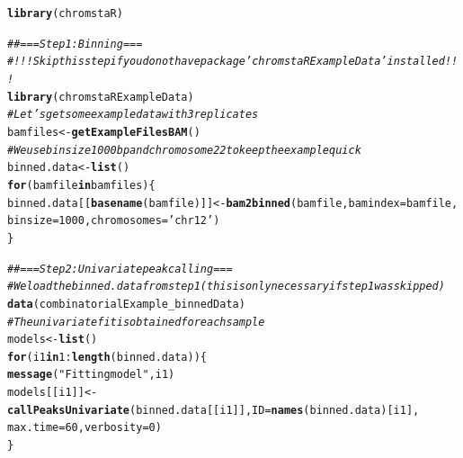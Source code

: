 \documentclass[11pt]{article}\usepackage[]{graphicx}\usepackage[]{color}
\makeatletter
\newcommand{\hlnum}[1]{\textcolor[rgb]{0.686,0.059,0.569}{#1}}%
\newcommand{\hlstr}[1]{\textcolor[rgb]{0.192,0.494,0.8}{#1}}%
\newcommand{\hlcom}[1]{\textcolor[rgb]{0.678,0.584,0.686}{\textit{#1}}}%
\newcommand{\hlopt}[1]{\textcolor[rgb]{0,0,0}{#1}}%
\newcommand{\hlstd}[1]{\textcolor[rgb]{0.345,0.345,0.345}{#1}}%
\newcommand{\hlkwa}[1]{\textcolor[rgb]{0.161,0.373,0.58}{\textbf{#1}}}%
\newcommand{\hlkwb}[1]{\textcolor[rgb]{0.69,0.353,0.396}{#1}}%
\newcommand{\hlkwc}[1]{\textcolor[rgb]{0.333,0.667,0.333}{#1}}%
\newcommand{\hlkwd}[1]{\textcolor[rgb]{0.737,0.353,0.396}{\textbf{#1}}}%
\newenvironment{kframe}{%
 \def\at@end@of@kframe{}%
 \ifinner\ifhmode%
  \def\at@end@of@kframe{\end{minipage}}%
  \begin{minipage}{\columnwidth}%
 \fi\fi%
 \def\FrameCommand##1{\hskip\@totalleftmargin \hskip-\fboxsep
 \colorbox{shadecolor}{##1}\hskip-\fboxsep
     \hskip-\linewidth \hskip-\@totalleftmargin \hskip\columnwidth}%
 \MakeFramed {\advance\hsize-\width
   \@totalleftmargin\z@ \linewidth\hsize
   \@setminipage}}%
 {\par\unskip\endMakeFramed%
 \at@end@of@kframe}
\newenvironment{knitrout}{}{} %
\makeatother
\begin{document}
\begin{scriptsize}
\begin{knitrout}
\color{fgcolor}\begin{kframe}
\begin{alltt}
\hlkwd{library}\hlstd{(chromstaR)}
\end{alltt}
\end{kframe}
\end{knitrout}

\begin{knitrout}
\color{fgcolor}\begin{kframe}
\begin{alltt}
\hlcom{## === Step 1: Binning ===}
\hlcom{# !!! Skip this step if you do not have package 'chromstaRExampleData' installed !!!}
\hlkwd{library}\hlstd{(chromstaRExampleData)}
\hlcom{# Let's get some example data with 3 replicates}
\hlstd{bamfiles} \hlkwb{<-} \hlkwd{getExampleFilesBAM}\hlstd{()}
\hlcom{# We use bin size 1000bp and chromosome 22 to keep the example quick}
\hlstd{binned.data} \hlkwb{<-} \hlkwd{list}\hlstd{()}
\hlkwa{for} \hlstd{(bamfile} \hlkwa{in} \hlstd{bamfiles) \{}
  \hlstd{binned.data[[}\hlkwd{basename}\hlstd{(bamfile)]]} \hlkwb{<-} \hlkwd{bam2binned}\hlstd{(bamfile,} \hlkwc{bamindex}\hlstd{=bamfile,}
                                                 \hlkwc{binsize}\hlstd{=}\hlnum{1000}\hlstd{,} \hlkwc{chromosomes}\hlstd{=}\hlstr{'chr12'}\hlstd{)}
\hlstd{\}}
\end{alltt}
\end{kframe}
\end{knitrout}

\begin{knitrout}
\color{fgcolor}\begin{kframe}
\begin{alltt}
\hlcom{## === Step 2: Univariate peak calling ===}
\hlcom{# We load the binned.data from step 1 (this is only necessary if step 1 was skipped)}
\hlkwd{data}\hlstd{(combinatorialExample_binnedData)}
\hlcom{# The univariate fit is obtained for each sample}
\hlstd{models} \hlkwb{<-} \hlkwd{list}\hlstd{()}
\hlkwa{for} \hlstd{(i1} \hlkwa{in} \hlnum{1}\hlopt{:}\hlkwd{length}\hlstd{(binned.data)) \{}
  \hlkwd{message}\hlstd{(}\hlstr{"Fitting model "}\hlstd{, i1)}
  \hlstd{models[[i1]]} \hlkwb{<-} \hlkwd{callPeaksUnivariate}\hlstd{(binned.data[[i1]],} \hlkwc{ID}\hlstd{=}\hlkwd{names}\hlstd{(binned.data)[i1],}
                                      \hlkwc{max.time}\hlstd{=}\hlnum{60}\hlstd{,} \hlkwc{verbosity}\hlstd{=}\hlnum{0}\hlstd{)}
\hlstd{\}}
\end{alltt}
\end{kframe}
\end{knitrout}


\end{scriptsize}
\end{document}
